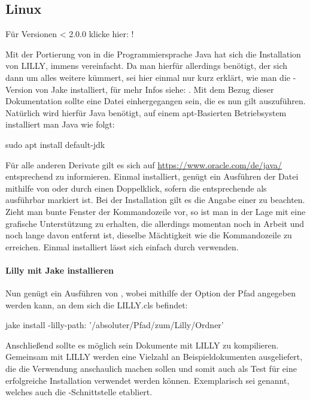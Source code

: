 \subsection{Linux}
\begin{center}
    Für Versionen < 2.0.0 klicke hier: !
\end{center}
Mit der Portierung von \Jake in die Programmiersprache Java hat sich die Installation von LILLY, immens vereinfacht.
Da man hierfür allerdings \Jake benötigt, der sich dann um alles weitere kümmert, sei hier einmal nur kurz erklärt, wie man die -Version von Jake installiert, für mehr Infos siehe: .\newline
Mit dem Bezug dieser Dokumentation sollte eine  Datei einhergegangen sein, die es nun gilt auszuführen. Natürlich wird hierfür Java benötigt, auf einem apt-Basierten Betriebsystem installiert man Java wie folgt:
\begin{bash*}
sudo apt install default-jdk
\end{bash*}
Für alle anderen Derivate gilt es sich auf \url{https://www.oracle.com/de/java/} entsprechend zu informieren.
Einmal installiert, genügt ein Ausführen der  Datei mithilfe von  oder durch
einen Doppelklick, sofern die entsprechende  als ausführbar markiert ist. Bei der Installation gilt es die Angabe einer  zu beachten.
Zieht man bunte Fenster der Kommandozeile vor, so ist man in der Lage mit \newline{} eine grafische Unterstützung zu erhalten, die allerdings momentan noch in Arbeit und noch lange davon entfernt ist, dieselbe Mächtigkeit wie die Kommandozeile zu erreichen. Einmal installiert lässt sich \Jake einfach durch  verwenden.

\paragraph{Lilly mit Jake installieren}
Nun genügt ein Ausführen von , wobei mithilfe der Option  der Pfad angegeben werden kann, an dem sich die LILLY.cls befindet:
\begin{bash*}
jake install -lilly-path: '/absoluter/Pfad/zum/Lilly/Ordner'
\end{bash*}
Anschließend sollte es möglich sein Dokumente mit LILLY zu kompilieren. Gemeinsam mit LILLY werden eine Vielzahl an Beispieldokumenten ausgeliefert, die die Verwendung anschaulich machen sollen und somit auch als Test für eine erfolgreiche Installation verwendet werden können.
Exemplarisch sei  genannt, welches auch die -Schnittstelle etabliert.

